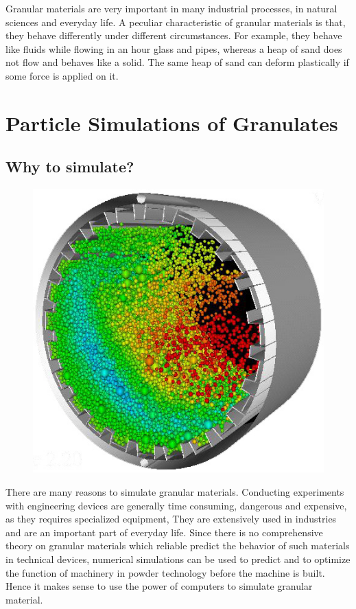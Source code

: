 Granular materials are very important in many industrial processes, in natural sciences and everyday life. A peculiar characteristic of granular materials is that, they behave differently under different circumstances. For example, they behave like fluids while flowing in an hour glass and pipes, whereas a heap of sand does not flow and behaves like a solid. The same heap of sand can deform plastically if some force is applied on it.

\section{Particle Simulations of Granulates}

\subsection{Why to simulate?}

\begin{figure}[H]
\includegraphics[scale=0.25]{../images/Intro/simulation.jpg}
\end{figure}

There are many reasons to simulate granular materials. Conducting experiments with engineering devices are generally time consuming, dangerous and expensive, as they requires specialized equipment, They are extensively used in industries and are an important part of everyday life. Since there is no comprehensive theory on granular materials which reliable predict the behavior of such materials in technical devices, numerical simulations can be used to predict and to optimize the function of machinery in powder technology before the machine is built. Hence it makes sense to use the power of computers to simulate granular material.

